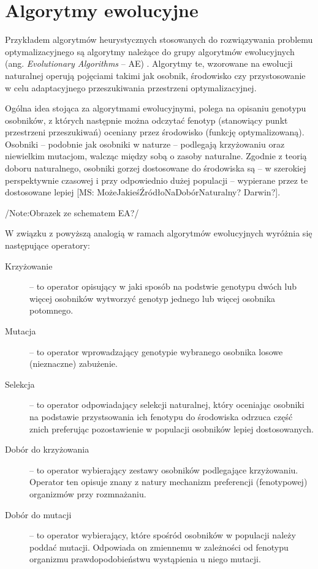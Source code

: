 \documentclass[11pt,a4paper]{report}
\begin{document}
{{\section{Algorytmy ewolucyjne}
\par{
Przykładem algorytmów heurystycznych stosowanych do rozwiązywania problemu optymalizacyjnego są algorytmy należące do grupy algorytmów ewolucyjnych (ang. \emph{Evolutionary Algorithms} -- AE) \cite{WykladyEvol,SpringerIntroToEvol}. Algorytmy te, wzorowane na ewolucji naturalnej operują pojęciami takimi jak osobnik, środowisko czy przystosowanie w celu adaptacyjnego przeszukiwania przestrzeni optymalizacyjnej.
}
\par{
Ogólna idea stojąca za algorytmami ewolucyjnymi, polega na opisaniu genotypu osobników, z których następnie można odczytać fenotyp (stanowiący punkt przestrzeni przeszukiwań) oceniany przez środowisko (funkcję optymalizowaną). Osobniki -- podobnie jak osobniki w naturze -- podlegają krzyżowaniu oraz niewielkim mutacjom, walcząc między sobą o zasoby naturalne. Zgodnie z teorią doboru naturalnego, osobniki gorzej dostosowane do środowiska są -- w szerokiej perspektywnie czasowej i przy odpowiednio dużej populacji -- wypierane przez te dostosowane lepiej [MS: MożeJakieśŹródłoNaDobórNaturalny? Darwin?].
}
\par{
/Note:Obrazek ze schematem EA?/
}
\par{
W związku z powyższą analogią w ramach algorytmów ewolucyjnych wyróżnia się następujące operatory:
\begin{description}
  \item[Krzyżowanie] -- to operator opisujący w jaki sposób na podstwie genotypu dwóch lub więcej osobników wytworzyć genotyp jednego lub więcej osobnika potomnego.
  \item[Mutacja] -- to operator wprowadzający genotypie wybranego osobnika losowe (nieznaczne) zabużenie.
  \item[Selekcja] -- to operator odpowiadający selekcji naturalnej, który oceniając osobniki na podstawie przystsowania ich fenotypu do środowiska odrzuca część znich preferując pozostawienie w populacji osobników lepiej dostosowanych.
  \item[Dobór do krzyżowania] -- to operator wybierający zestawy osobników podlegające krzyżowaniu. Operator ten opisuje znany z natury mechanizm preferencji (fenotypowej) organizmów przy rozmnażaniu.
  \item[Dobór do mutacji] -- to operator wybierający, które spośród osobników w populacji należy poddać mutacji. Odpowiada on zmiennemu w zależności od fenotypu organizmu prawdopodobieństwu wystąpienia u niego mutacji.

\end{description}}}}
\end{document}
